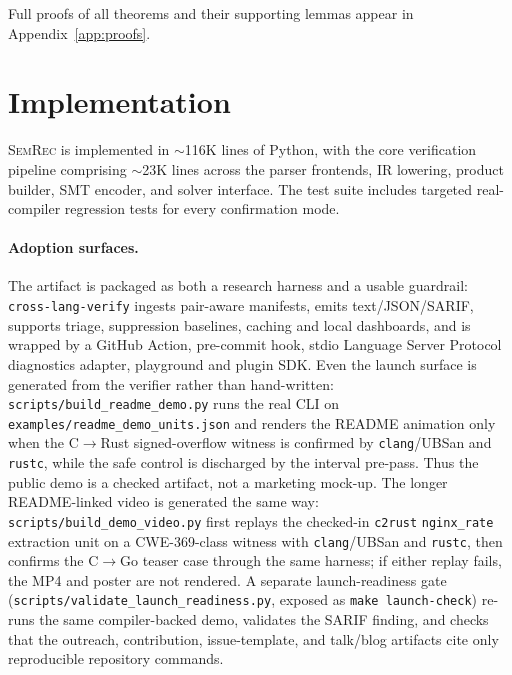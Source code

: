 \documentclass[10pt,a4paper]{article}
\begin{document}
Full proofs of all theorems and their supporting lemmas appear in
Appendix~\ref{app:proofs}.


\section{Implementation}\label{sec:implementation}

\textsc{SemRec} is implemented in ${\sim}$116K lines of Python,
with the core verification pipeline comprising ${\sim}$23K lines
across the parser frontends, IR lowering, product builder, SMT
encoder, and solver interface.  The test suite includes targeted
real-compiler regression tests for every confirmation mode.

\paragraph{Adoption surfaces.}
The artifact is packaged as both a research harness and a usable guardrail:
\texttt{cross-lang-verify} ingests pair-aware manifests, emits text/JSON/SARIF,
supports triage, suppression baselines, caching and local dashboards, and is
wrapped by a GitHub Action, pre-commit hook, stdio Language Server Protocol
diagnostics adapter, playground and plugin SDK.
Even the launch surface is generated from the verifier rather than hand-written:
\texttt{scripts/build\_readme\_demo.py} runs the real CLI on
\texttt{examples/readme\_demo\_units.json} and renders the README animation only
when the C$\to$Rust signed-overflow witness is confirmed by
\texttt{clang}/UBSan and \texttt{rustc}, while the safe control is discharged by
the interval pre-pass.  Thus the public demo is a checked artifact, not a
marketing mock-up.  The longer README-linked video is generated the same way:
\texttt{scripts/build\_demo\_video.py} first replays the checked-in
\texttt{c2rust} \texttt{nginx\_rate} extraction unit on a CWE-369-class witness
with \texttt{clang}/UBSan and \texttt{rustc}, then confirms the C$\to$Go teaser
case through the same harness; if either replay fails, the MP4 and poster are not
rendered.  A separate launch-readiness gate
(\texttt{scripts/validate\_launch\_readiness.py}, exposed as
\texttt{make launch-check}) re-runs the same compiler-backed demo, validates the
SARIF finding, and checks that the outreach, contribution, issue-template, and
talk/blog artifacts cite only reproducible repository commands.
\end{document}
